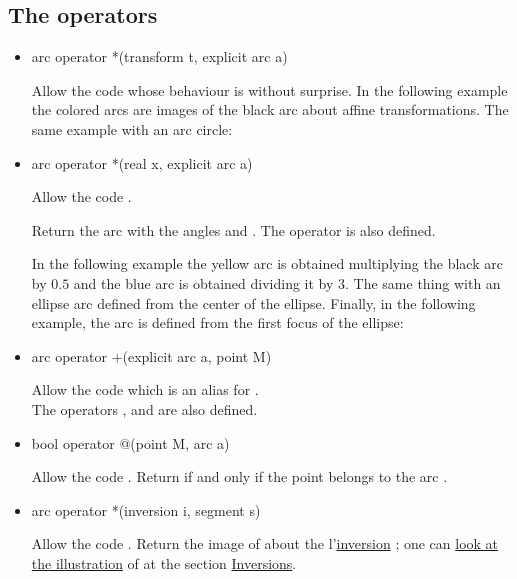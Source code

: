 \documentclass[pdftex]{article}
\newcommand{\ssi}{if and only if\xspace}
\begin{document}
\subsection{The operators}
\begin{itemize}
\item {}
  \begin{Vcolor}
    arc operator *(transform t, explicit arc a)
  \end{Vcolor}
  Allow the code  whose behaviour is without
  surprise. In the following example the colored arcs are images of
  the black arc about affine transformations.
  The same example with an arc circle:
\item {}
  \begin{Vcolor}
    arc operator *(real x, explicit arc a)
  \end{Vcolor}
  Allow the code .

  Return the arc  with the angles 
  and . The operator
   is also defined.

  In the following example the yellow arc is obtained multiplying
  the black arc by $0.5$ and the blue arc is obtained dividing it by $3$.
  The same thing with an ellipse arc defined from the center of the ellipse.
  Finally, in the following example, the arc is defined from the
  first focus of the ellipse:
\item {}%
  \begin{Vcolor}
    arc operator +(explicit arc a, point M)
  \end{Vcolor}
  Allow the code  which is an alias for .\\
  The operators
  ,  and
   are also defined.
\item {}
  \begin{Vcolor}
    bool operator @(point M, arc a)
  \end{Vcolor}
  Allow the code .
  Return  \ssi the point  belongs to the arc .
\item {}
  \begin{Vcolor}
    arc operator *(inversion i, segment s)
  \end{Vcolor}
  Allow the code .
  Return the image of  about the
  l'\href{#section.inversions}{inversion} ; one can
  \href{#inversion_damier}{look at the illustration} of
   at the section \href{#section.inversion}{Inversions}.
\end{itemize}
\end{document}
